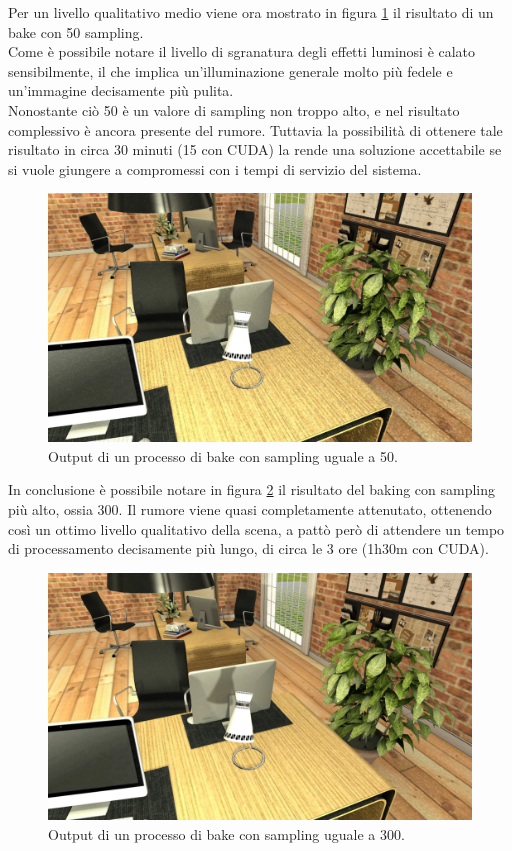 Per un livello qualitativo medio viene ora mostrato in figura \ref{fig:sampl50} il risultato di un bake con 50 sampling. 
\\
Come è possibile notare il livello di sgranatura degli effetti luminosi è calato sensibilmente, il che implica un’illuminazione generale molto più fedele e un’immagine decisamente più pulita.
\\
Nonostante ciò 50 è un valore di sampling non troppo alto, e nel risultato complessivo è ancora presente del rumore. Tuttavia la possibilità di ottenere tale risultato in circa 30 minuti (15 con CUDA) la rende una soluzione accettabile se si vuole giungere a compromessi con i tempi di servizio del sistema.
\\
\begin{figure}[htb]
 \centering
 \includegraphics[width=0.8\linewidth]{images/chapter_prove_sperimentali/sampl50.png}\hfill
 \caption[Output sampling 50]{Output di un processo di bake con sampling uguale a 50.}
 \label{fig:sampl50}
\end{figure}

In conclusione è possibile notare in figura \ref{fig:sampl300} il risultato del baking con sampling più alto, ossia 300. Il rumore viene quasi completamente attenutato, ottenendo così un ottimo livello qualitativo della scena, a pattò però di attendere un tempo di processamento decisamente più lungo, di circa le 3 ore (1h30m con CUDA).
\\
\begin{figure}[htb]
 \centering
 \includegraphics[width=0.8\linewidth]{images/chapter_prove_sperimentali/sampl300.png}\hfill
 \caption[Output sampling 300]{Output di un processo di bake con sampling uguale a 300.}
 \label{fig:sampl300}
\end{figure}

